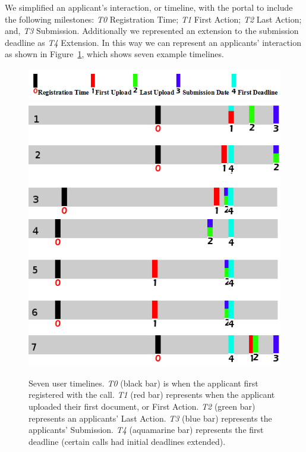 \documentclass{AISB2008}
\begin{document}
We simplified an applicant's interaction, or timeline, with the portal
to include the following milestones: {\emph{T0}} Registration Time;
{\emph{T1}} First Action; {\emph{T2}} Last Action; and, {\emph{T3}}
Submission. Additionally we represented an extension to the submission
deadline as {\emph{T4}} Extension. In this way we can represent an
applicants’ interaction as shown in Figure~\ref{fig:timelines}, which
shows seven example timelines.

\begin{figure}[!ht]
\centering
\includegraphics[width=\columnwidth]{images/legend.jpg}
\includegraphics[width=\columnwidth]{images/timelines.jpg}
\caption{Seven user timelines. {\emph{T0}} (black bar) is when the applicant first
registered with the call. {\emph{T1}} (red bar) represents when the applicant
uploaded their first document, or First Action. {\emph{T2}} (green bar)
represents an applicants' Last Action. {\emph{T3}} (blue bar) represents the
applicants' Submission. {\emph{T4}} (aquamarine bar) represents the first
deadline (certain calls had initial deadlines extended).}
\label{fig:timelines}
\end{figure}
\end{document}
